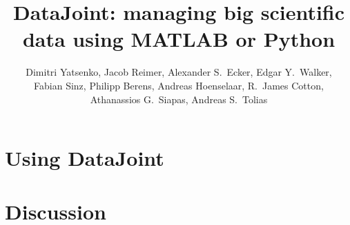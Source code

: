 \documentclass[10pt,twocolumn]{article}
\title{DataJoint: managing big scientific data using MATLAB or Python}
\author{Dimitri Yatsenko, Jacob Reimer, Alexander S.~Ecker, Edgar Y.~Walker,\\ 
Fabian Sinz, Philipp Berens, Andreas Hoenselaar, R.~James Cotton,\\ Athanassios G.~Siapas, Andreas S.~Tolias
}
\begin{document}
\maketitle




\section*{Using DataJoint}






\section*{Discussion}





\end{document}
